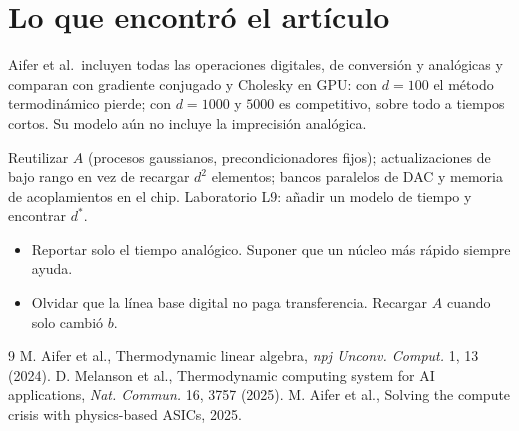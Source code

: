 \documentclass[11pt,a4paper]{article}
\begin{document}
\section{Lo que encontró el artículo}
Aifer et al.\ incluyen todas las operaciones digitales, de conversión y analógicas y comparan con gradiente conjugado y Cholesky en GPU: con $d=100$ el método
termodinámico pierde; con $d=1000$ y $5000$ es competitivo, sobre todo a tiempos cortos. Su modelo aún no incluye la imprecisión analógica.

\begin{aplicacion}
Reutilizar $A$ (procesos gaussianos, precondicionadores fijos); actualizaciones de bajo rango en vez de recargar $d^2$ elementos; bancos paralelos de DAC y memoria de
acoplamientos en el chip. Laboratorio L9: añadir un modelo de tiempo y encontrar $d^\ast$.
\end{aplicacion}

\begin{error}
\begin{itemize}[nosep]
\item Reportar solo el tiempo analógico. \quad Suponer que un núcleo más rápido siempre ayuda.
\item Olvidar que la línea base digital no paga transferencia. \quad Recargar $A$ cuando solo cambió $b$.
\end{itemize}
\end{error}

\begin{thebibliography}{9}\small
{} M. Aifer et al., Thermodynamic linear algebra, \emph{npj Unconv. Comput.} 1, 13 (2024).
 D. Melanson et al., Thermodynamic computing system for AI applications, \emph{Nat. Commun.} 16, 3757 (2025).
 M. Aifer et al., Solving the compute crisis with physics-based ASICs, 2025.
\end{thebibliography}
\end{document}
